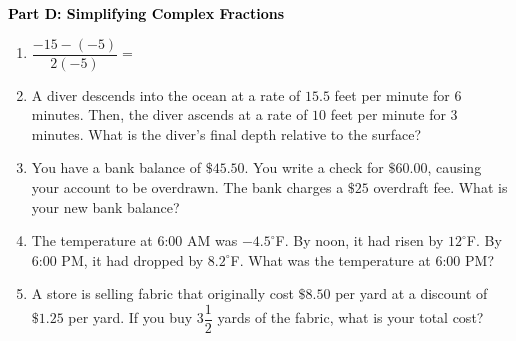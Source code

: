 \documentclass[12pt, letterpaper, fleqn]{article}
\begin{document}
\newpage

\begin{tcolorbox}[colback=customteal!20]
\large\textcolor{black}{\textbf{Part D: Simplifying Complex Fractions}}
\end{tcolorbox}

\vspace{3mm}

\begin{enumerate}[itemsep=2.5cm, leftmargin=0.6cm, resume]
\item $\dfrac{-15 - (-5)}{2(-5)} =$
\item A diver descends into the ocean at a rate of $15.5$ feet per minute for $6$ minutes. Then, the diver ascends at a rate of $10$ feet per minute for $3$ minutes. What is the diver's final depth relative to the surface?
\item You have a bank balance of $\$45.50$. You write a check for $\$60.00$, causing your account to be overdrawn. The bank charges a $\$25$ overdraft fee. What is your new bank balance?
\item The temperature at 6:00 AM was $-4.5^\circ$F. By noon, it had risen by $12^\circ$F. By 6:00 PM, it had dropped by $8.2^\circ$F. What was the temperature at 6:00 PM?
\item A store is selling fabric that originally cost $\$8.50$ per yard at a discount of $\$1.25$ per yard. If you buy $3\dfrac{1}{2}$ yards of the fabric, what is your total cost?
\end{enumerate}
\end{document}
